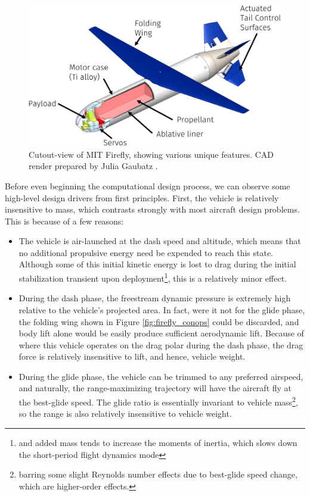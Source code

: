 \begin{figure}[h]
    \centering
    \includegraphics[width=\textwidth]{../figures/firefly_cutout-crop.pdf}
    \caption{Cutout-view of MIT Firefly, showing various unique features. CAD render prepared by Julia Gaubatz \cite{gaubatz_design_2024}.}
    \label{fig:firefly_cutout}
\end{figure}

Before even beginning the computational design process, we can observe some high-level design drivers from first principles. First, the vehicle is relatively insensitive to mass, which contrasts strongly with most aircraft design problems. This is because of a few reasons:
\begin{itemize}[noitemsep]
    \item The vehicle is air-launched at the dash speed and altitude, which means that no additional propulsive energy need be expended to reach this state. Although some of this initial kinetic energy is lost to drag during the initial stabilization transient upon deployment\footnote{and added mass tends to increase the moments of inertia, which slows down the short-period flight dynamics mode}, this is a relatively minor effect.
    \item During the dash phase, the freestream dynamic pressure is extremely high relative to the vehicle's projected area. In fact, were it not for the glide phase, the folding wing shown in Figure \ref{fig:firefly_conops} could be discarded, and body lift alone would be easily produce sufficient aerodynamic lift. Because of where this vehicle operates on the drag polar during the dash phase, the drag force is relatively insensitive to lift, and hence, vehicle weight.
    \item During the glide phase, the vehicle can be trimmed to any preferred airspeed, and naturally, the range-maximizing trajectory will have the aircraft fly at the best-glide speed. The glide ratio is essentially invariant to vehicle mass\footnote{barring some slight Reynolds number effects due to best-glide speed change, which are higher-order effects.}, so the range is also relatively insensitive to vehicle weight.
\end{itemize}

